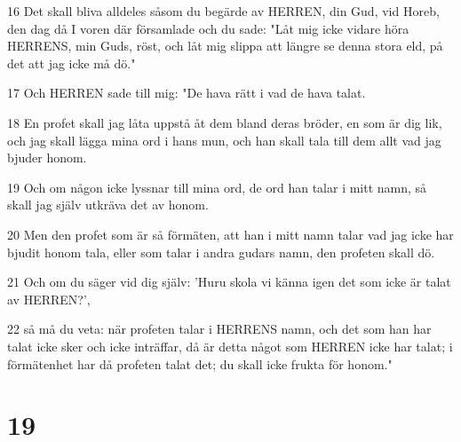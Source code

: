 \par 16 Det skall bliva alldeles såsom du begärde av HERREN, din Gud, vid Horeb, den dag då I voren där församlade och du sade: "Låt mig icke vidare höra HERRENS, min Guds, röst, och låt mig slippa att längre se denna stora eld, på det att jag icke må dö."
\par 17 Och HERREN sade till mig: "De hava rätt i vad de hava talat.
\par 18 En profet skall jag låta uppstå åt dem bland deras bröder, en som är dig lik, och jag skall lägga mina ord i hans mun, och han skall tala till dem allt vad jag bjuder honom.
\par 19 Och om någon icke lyssnar till mina ord, de ord han talar i mitt namn, så skall jag själv utkräva det av honom.
\par 20 Men den profet som är så förmäten, att han i mitt namn talar vad jag icke har bjudit honom tala, eller som talar i andra gudars namn, den profeten skall dö.
\par 21 Och om du säger vid dig själv: 'Huru skola vi känna igen det som icke är talat av HERREN?',
\par 22 så må du veta: när profeten talar i HERRENS namn, och det som han har talat icke sker och icke inträffar, då är detta något som HERREN icke har talat; i förmätenhet har då profeten talat det; du skall icke frukta för honom."

\chapter{19}

